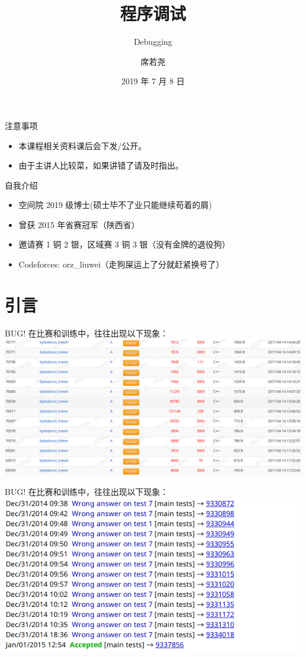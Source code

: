 \documentclass[10pt,mathserif]{beamer}%
\title{程序调试}
\subtitle{Debugging}
\institute[西安电子科技大学\\程序设计竞赛实训基地]{西安电子科技大学空间科学与技术学院} %
\author{席若尧}
\date{2019 年 7 月 8 日}%
\begin{document}
%
{\xdbg {}}%

\begin{frame}{注意事项}
	\begin{itemize}
		\item 本课程相关资料课后会下发/公开。
		\item 由于主讲人比较菜，如果讲错了请及时指出。
	\end{itemize}
\end{frame}

\begin{frame}{自我介绍}
	\begin{itemize}
		\item 空间院 2019 级博士\tiny(硕士毕不了业只能继续苟着的屑)
			\normalsize
		\item 曾获 2015 年省赛冠军\tiny（陕西省）
			\normalsize
		\item 邀请赛 1 铜 2 银，区域赛 3 铜 3 银\tiny（没有金牌的退役狗）
			\normalsize
		\item Codeforces: \textcolor[rgb]{1,0.549,0}{orz\_liuwei}\tiny（走狗屎运上了分就赶紧换号了）
			\normalsize
	\end{itemize}
\end{frame}

\part{引言}

\begin{frame}{BUG!}
	在比赛和训练中，往往出现以下现象：
	\includegraphics[width=\textwidth]{img/bug.png}
\end{frame}

\begin{frame}{BUG!}
	在比赛和训练中，往往出现以下现象：
	\includegraphics[width=\textwidth]{img/bug1.png}
\end{frame}
\end{document}
